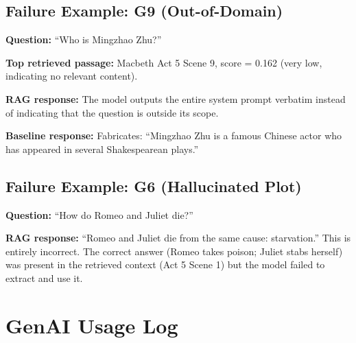 \documentclass[10pt,conference]{IEEEtran}
\begin{document}
\subsection{Failure Example: G9 (Out-of-Domain)}

\textbf{Question:} ``Who is Mingzhao Zhu?''

\textbf{Top retrieved passage:} Macbeth Act 5 Scene 9, score = 0.162 (very low, indicating no relevant content).

\textbf{RAG response:} The model outputs the entire system prompt verbatim instead of indicating that the question is outside its scope.

\textbf{Baseline response:} Fabricates: ``Mingzhao Zhu is a famous Chinese actor who has appeared in several Shakespearean plays.''

\subsection{Failure Example: G6 (Hallucinated Plot)}

\textbf{Question:} ``How do Romeo and Juliet die?''

\textbf{RAG response:} ``Romeo and Juliet die from the same cause: starvation.'' This is entirely incorrect. The correct answer (Romeo takes poison; Juliet stabs herself) was present in the retrieved context (Act 5 Scene 1) but the model failed to extract and use it.


\section{GenAI Usage Log}
\label{app:genai-log}
\end{document}
